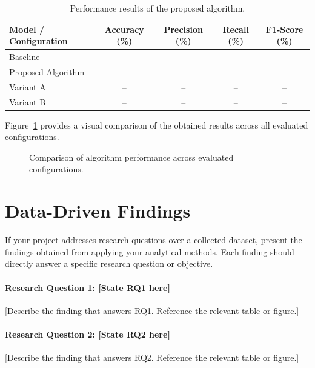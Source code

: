 \begin{table}[ht]
    \centering
    \caption{Performance results of the proposed algorithm.}
    \label{tab:results-metrics}
    \begin{tabular}{lcccc}
        \hline
        \textbf{Model / Configuration} & \textbf{Accuracy (\%)} &
        \textbf{Precision (\%)} & \textbf{Recall (\%)} & \textbf{F1-Score (\%)} \\
        \hline
        Baseline                        & --   & --   & --   & --   \\
        Proposed Algorithm              & --   & --   & --   & --   \\
        Variant A                       & --   & --   & --   & --   \\
        Variant B                       & --   & --   & --   & --   \\
        \hline
    \end{tabular}
\end{table}

Figure~\ref{fig:perf-comparison} provides a visual comparison of the obtained
results across all evaluated configurations.

\begin{figure}[ht]
    \centering
    \caption{Comparison of algorithm performance across evaluated configurations.}
    \label{fig:perf-comparison}
\end{figure}

\section{Data-Driven Findings}
\label{sec:data-findings}

If your project addresses research questions over a collected dataset, present
the findings obtained from applying your analytical methods. Each finding should
directly answer a specific research question or objective.

\paragraph{Research Question 1: [State RQ1 here]}
[Describe the finding that answers RQ1. Reference the relevant table or figure.]

\paragraph{Research Question 2: [State RQ2 here]}
[Describe the finding that answers RQ2. Reference the relevant table or figure.]

